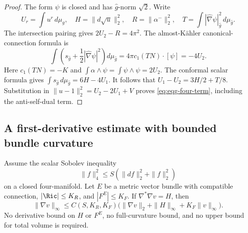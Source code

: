 \begin{proof}
The form $\psi$ is closed and has $\widehat g$-norm $\sqrt2$.
Write
\[
 U_r=\int u^r\,d\mu_g,\quad
 H=\|d\sqrt u\|_2^2,\quad R=\|\alpha^-\|_2^2,\quad
 T=\int|\widehat\nabla\psi|^2_{\widehat g}\,d\mu_{\widehat g}.
\]
The intersection pairing gives $2U_2-R=4\pi^2$.
The almost-Kähler canonical-connection formula is
\[
 \int\left(s_{\widehat g}
            +\frac12|\widehat\nabla\psi|^2\right)d\mu_{\widehat g}
 =4\pi c_1(TN)\cdot[\psi]=-4U_2.
\]
Here $c_1(TN)=-K$ and
$\int\alpha\wedge\psi=\int\psi\wedge\psi=2U_2$.
The conformal scalar formula gives
$\int s_{\widehat g}\,d\mu_{\widehat g}=6H-4U_1$.
It follows that $U_1-U_2=3H/2+T/8$.
Substitution in $\|u-1\|_2^2=U_2-2U_1+V$ proves
\eqref{eq:eqg-four-term}, including the anti-self-dual term.
\end{proof}

\subsection{A first-derivative estimate with bounded bundle curvature}

\begin{lemma}\label{lem:eqg-bundle-gradient}
Assume the scalar Sobolev inequality
\begin{equation}\label{eq:eqg-sobolev}
 \|f\|_4^2\leq S(\|df\|_2^2+\|f\|_2^2)
\end{equation}
on a closed four-manifold.  Let $E$ be a metric vector bundle with
compatible connection, $|\Ric|\leq K_R$, and $|F^E|\leq K_F$.
If $\nabla^*\nabla v=H$, then
\begin{equation}\label{eq:eqg-bundle-gradient}
 \|\nabla v\|_\infty
 \leq C(S,K_R,K_F)
 \bigl(\|\nabla v\|_2+\|H\|_\infty
                         +K_F\|v\|_\infty\bigr).
\end{equation}
No derivative bound on $H$ or $F^E$, no full-curvature bound, and no
upper bound for total volume is required.
\end{lemma}

